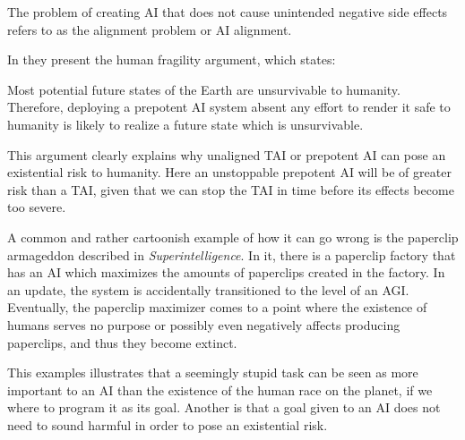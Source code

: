 \documentclass[12pt,A4]{report}
\theoremstyle{definition}
\begin{document}
The problem of creating AI that does not cause unintended negative side effects refers to as the alignment problem or AI alignment. 


In \autocite{Critch Kruger} they present the human fragility argument, which states: 
\begin{displayquote}
  Most potential future states of the Earth are unsurvivable to humanity. Therefore, deploying a prepotent AI system absent any effort to render it safe to humanity is likely to realize a future state which is unsurvivable. 
\end{displayquote}
This argument clearly explains why unaligned TAI or prepotent AI can pose an existential risk to humanity. Here an unstoppable prepotent AI will be of greater risk than a TAI, given that we can stop the TAI in time before its effects become too severe.


A common and rather cartoonish example of how it can go wrong is the paperclip armageddon described in \textit{Superintelligence}. In it, there is a paperclip factory that has an AI which maximizes the amounts of paperclips created in the factory. In an update, the system is accidentally transitioned to the level of an AGI. Eventually, the paperclip maximizer comes to a point where the existence of humans serves no purpose or possibly even negatively affects producing paperclips, and thus they become extinct. 

This examples illustrates that a seemingly stupid task can be seen as more important to an AI than the existence of the human race on the planet, if we where to program it as its goal. Another is that a goal given to an AI does not need to sound harmful in order to pose an existential risk. 
\end{document}
